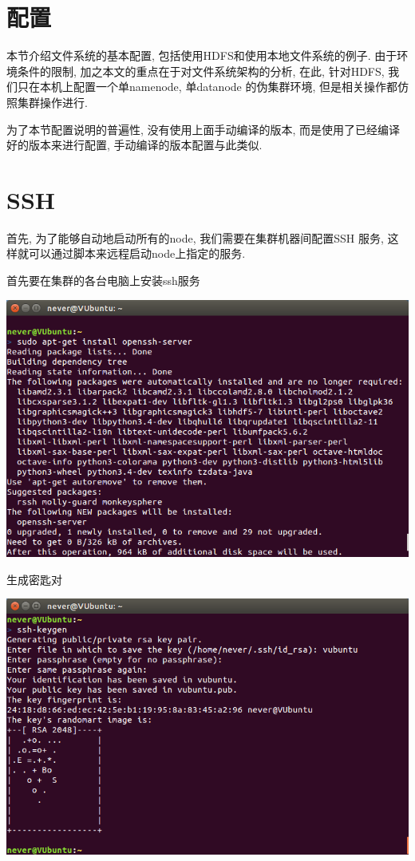 \section{配置}

本节介绍{\Hadoop}文件系统的基本配置, 包括使用HDFS和使用本地文件系统的例子.
由于环境条件的限制, 加之本文的重点在于对{\Hadoop}文件系统架构的分析,
在此, 针对HDFS, 我们只在本机上配置一个单namenode, 单datanode
的伪集群环境, 但是相关操作都仿照集群操作进行.

为了本节配置说明的普遍性, 没有使用上面手动编译的版本, 而是使用了已经编译好的版本来进行配置,
手动编译的版本配置与此类似.

\section{SSH}

首先, 为了能够自动地启动所有的node, 我们需要在集群机器间配置SSH
服务, 这样就可以通过脚本来远程启动node上指定的服务.

首先要在集群的各台电脑上安装ssh服务

\includegraphics[width=\textwidth]{image/env/cr1.png}

生成密匙对

\includegraphics[width=\textwidth]{image/env/cr2.png}

